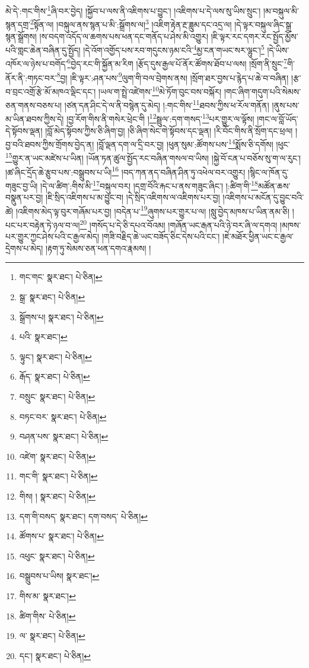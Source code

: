མེ་དེ་:གང་གིས་\footnote{གང་གང་  སྣར་ཐང་།  པེ་ཅིན། }ཞི་བར་བྱེད། །སྐྱོབ་པ་ལས་ནི་འཇིགས་པ་བྱུང་། །འཇིགས་པ་དེ་ལས་སུ་ཡིས་སྲུང་། །མ་བསྐུལ་མི་སྙན་དགྲ་\footnote{སྒྲ་  སྣར་ཐང་།  པེ་ཅིན། }སྟོན་ལ། །བསྐུལ་ནས་སྙན་པ་མི་:སྒྲོགས་ལ།\footnote{སྒྲོགས་པ།  སྣར་ཐང་།  པེ་ཅིན། } །འཇིག་རྟེན་རྔ་ཟླུམ་དང་འདྲ་ལ། །དེ་ལྟར་བསྐུལ་ཞིང་སྒྲ་སྙན་སྒྲོགས། །ས་བདག་འདོད་ལ་ཆགས་པས་ཕན་དང་གནོད་པ་ཤེས་མི་འགྱུར། །ཇི་ལྟར་རང་དགར་རང་སྤྱོད་མྱོས་པའི་གླང་ཆེན་བཞིན་དུ་སྤྱོད། །དེ་འོག་འགྱོད་པས་རབ་གདུངས་ཉམ་ངའི་\footnote{པའི་  སྣར་ཐང་། }མྱ་ངན་གཡང་སར་ལྷུང་།\footnote{ལྟུང་།  སྣར་ཐང་།  པེ་ཅིན། } །དེ་ཡིས་འཁོར་ལ་ཉེས་པ་བགོད་\footnote{རྒོད་  སྣར་ཐང་།  པེ་ཅིན། }བྱེད་རང་གི་སྐྱོན་མ་རིག །རྩོད་དུས་རྒྱལ་པོ་ནོར་ཚོགས་ཐོབ་པ་ལས། །སྲོག་ནི་སྲུང་\footnote{བསྲུང་  སྣར་ཐང་།  པེ་ཅིན། }གི་ནོར་ནི་:གཏང་བར་\footnote{བཏང་བར་  སྣར་ཐང་།  པེ་ཅིན། }བྱ། །ཇི་ལྟར་:ཤན་པས་\footnote{བཤན་པས་  སྣར་ཐང་།  པེ་ཅིན། }ལུག་གི་བལ་བྲེགས་ནས། །སྲོག་ཐར་བྱས་པ་རྙེད་པ་ཆེ་བ་བཞིན། །རྩ་བ་བྲང་འགྲོ་རྩེ་མོ་མཁའ་ལྡིང་དང་། །ཡལ་ག་སྤྲེ་འཛེགས་\footnote{འཛེག་  སྣར་ཐང་།  པེ་ཅིན། }མེ་ཏོག་བུང་བས་བསྐོར། །གང་ཞིག་གདུག་པའི་སེམས་ཅན་གནས་བཅས་པ། །ཙན་དན་ཤིང་དེ་ལ་ནི་བསྙེན་དུ་མེད། །:གང་གིས་\footnote{གང་གི་  སྣར་ཐང་།  པེ་ཅིན། }ཐབས་ཀྱིས་ཕ་རོལ་གནོན། །ནུས་པས་མ་ཡིན་ཐབས་ཀྱིས་དེ། །བྱ་རོག་གིས་ནི་གསེར་ཕྲེང་གི །\footnote{གིས། །  སྣར་ཐང་།  པེ་ཅིན། }སྦྲུལ་:དག་གསད་\footnote{དག་གི་བསད་  སྣར་ཐང་། དག་བསད་  པེ་ཅིན། }པར་གྱུར་ལ་ལྟོས། །གང་ལ་བློ་ཡོད་དེ་སྟོབས་ལྡན། །བློ་མེད་སྟོབས་ཀྱིས་ཅི་ཞིག་བྱ། །ཅི་ཞིག་སེང་གེ་སྟོབས་དང་ལྡན། །རི་བོང་གིས་ནི་སྲོག་དང་ཕྲལ། །བྱ་བའི་ཐབས་ཀྱིས་གྲོགས་བྱེད་ན། །བློ་ལྡན་དག་ལ་དྲི་བར་བྱ། །ཕུན་སུམ་:ཚོགས་པས་\footnote{ཚོགས་པ་  སྣར་ཐང་།  པེ་ཅིན། }སྨོས་ཅི་དགོས། །ཕུང་\footnote{འཕུང་  སྣར་ཐང་།  པེ་ཅིན། }གྱུར་ན་ཡང་མཛེས་པ་ཡིན། །ཡོན་ཏན་ཚུལ་སྤྱོད་རང་བཞིན་གསལ་བ་ཡིས། །སྐྱེ་བོ་ངན་པ་བཅོས་སུ་ག་ལ་རུང་། །ཚ་ཞིང་དྲོད་ཆེ་རྩུབ་པས་:བསྒྲུབས་པ་ཡི།\footnote{བསྒྲུབས་པ་ཡིས།  སྣར་ཐང་། } །བད་ཀན་ནད་བཞིན་ཤིན་ཏུ་འཕེལ་བར་འགྱུར། །སྙིང་ལ་ཁོན་དུ་གཟུང་བྱ་ཡི། །དེ་ལ་ཚིག་:གིས་མི་\footnote{གིས་མ་  སྣར་ཐང་། }བསྐུལ་བར། །དགྲ་བོའི་རྐང་པ་ནས་གཟུང་ཞིང་། །:ཚིག་གི་\footnote{ཚིག་གིས་  པེ་ཅིན། }མཚོན་ཆས་བསྣུན་པར་བྱ། །ཇི་སྲིད་འཇིགས་པ་མ་བྱུང་བ། །དེ་སྲིད་འཇིགས་ལ་འཇིགས་པར་བྱ། །འཇིགས་པ་མངོན་དུ་བྱུང་བའི་ཚེ། །འཇིགས་མེད་ལྟ་བུར་གཞོམ་པར་བྱ། །བདེན་པ་\footnote{ལ་  སྣར་ཐང་།  པེ་ཅིན། }ཞུགས་པར་གྱུར་པ་ལ། །སླུ་བྱེད་མཁས་པ་ཡིན་ནམ་ཅི། །པང་པར་བརྟེན་ཏེ་ཉལ་བ་ལ།\footnote{དང་།  སྣར་ཐང་།  པེ་ཅིན། } །གསོད་པ་དེ་ཅི་དཔའ་བོའམ། །གཞོན་ཡང་རྒན་པའི་ཉེ་བར་ཞི་ལ་དགའ། །མཁས་པར་གྱུར་ཀྱང་ཤེས་པའི་ང་རྒྱལ་མེད། །གཟི་བརྗིད་ཆེ་ཡང་བཟོད་ཅིང་དེས་པའི་ངང་། །ཇེ་མཐོར་ཕྱིན་ཡང་ང་རྒྱལ་དྲེགས་པ་མེད། །རྟག་ཏུ་སེམས་ཅན་ཕན་དགའ་རྣམས། །
